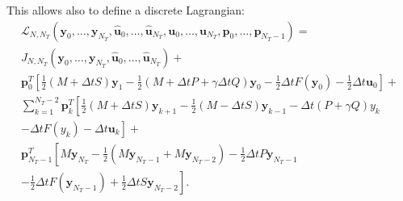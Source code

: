This allows also to define a discrete Lagrangian:
 \begin{multline}
 \mathcal{L}_{N,N_{T}}(\mathbf{y}_{0}, \ldots, \mathbf{y}_{N_{T}}, \mathbf{\hat u}_{0}, \ldots, \mathbf{\hat u}_{N_{T}}, \mathbf{u}_{0}, \ldots, \mathbf{ u}_{N_{T}}, \mathbf{p}_{0}, \ldots, \mathbf{p}_{N_{T}-1}) = \\
 J_{N,N_{T}}(\mathbf{y}_{0}, \ldots, \mathbf{y}_{N_{T}}, \mathbf{\hat u}_{0}, \ldots, \mathbf{\hat u}_{N_{T}})  +\\
   \mathbf{p}_0^T\left[ \frac{1}{2}\left( M+\Delta t S\right) \mathbf{y}_1 - \frac{1}{2}\left( M + \Delta t P + \gamma \Delta t Q \right) \mathbf{y}_0 - \frac{1}{2}\Delta t F(\mathbf{y}_0) - \frac{1}{2}\Delta t \mathbf{u}_0 \right]+\\
  \sum_{k=1}^{N_T-2}{\mathbf{p}_k^T\left[\frac{1}{2}\left( M+\Delta t S\right) \mathbf{y}_{k+1} - \frac{1}{2}\left( M - \Delta t S\right) \mathbf{y}_{k-1} - \Delta t \left( P + \gamma Q\right)y_k \right.}\\
  \left.- \Delta t F(y_k) - \Delta t \mathbf{u}_k\right] + \\
 \mathbf{p}_{N_T-1}^T\left[ M \mathbf{y}_{N_T} - \frac{1}{2}\left( M \mathbf{y}_{N_T-1} + M \mathbf{y}_{N_T-2} \right)- \frac{1}{2}\Delta t P \mathbf{y}_{N_T - 1} \right.\\ \left.- \frac{1}{2}\Delta t F(\mathbf{y}_{N_T-1}) +\frac{1}{2}\Delta t S \mathbf{y}_{N_T-2}\right].
  \label{discrlag}
 \end{multline}

